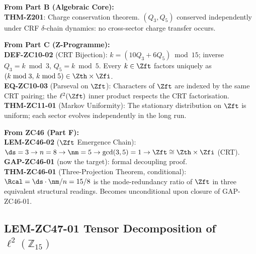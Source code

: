 \documentclass[12pt, a4paper]{article}
\begin{document}
\begin{formalbox}[title={Inherited Objects Used by ZC47}]
\textbf{From Part B (Algebraic Core):}\\
\textbf{THM-Z201}: Charge conservation theorem.
$(Q_3, Q_5)$ conserved independently under CRF $\delta$-chain
dynamics: no cross-sector charge transfer occurs.

\medskip
\textbf{From Part C (Z-Programme):}\\
\textbf{DEF-ZC10-02} (CRT Bijection):
$k = (10Q_3 + 6Q_5) \bmod 15$; inverse
$Q_3 = k \bmod 3$, $Q_5 = k \bmod 5$.
Every $k \in \Zft$ factors uniquely as $(k \bmod 3,\, k \bmod 5)
\in \Zth \times \Zfi$.\\
\textbf{EQ-ZC10-03} (Parseval on $\Zft$):
Characters of $\Zft$ are indexed by the same CRT pairing;
the $\ell^2(\Zft)$ inner product respects the CRT factorisation.\\
\textbf{THM-ZC11-01} (Markov Uniformity):
The stationary distribution on $\Zft$ is uniform; each sector
evolves independently in the long run.

\medskip
\textbf{From ZC46 (Part F):}\\
\textbf{LEM-ZC46-02} ($\Zft$ Emergence Chain):
$\ds = 3 \to n = 8 \to \nm = 5 \to \gcd(3,5) = 1
\to \Zft \cong \Zth \times \Zfi$ (CRT).\\
\textbf{GAP-ZC46-01} (now the target): formal decoupling proof.\\
\textbf{THM-ZC46-01} (Three-Projection Theorem, conditional):
$\Rcal = \ds\cdot\nm/n = 15/8$ is the mode-redundancy ratio of
$\Zft$ in three equivalent structural readings.
Becomes unconditional upon closure of GAP-ZC46-01.
\end{formalbox}

\subsection{LEM-ZC47-01 \quad Tensor Decomposition of
  $\ell^2(\mathbb{Z}_{15})$}
\label{sec:lem01}

\end{document}
